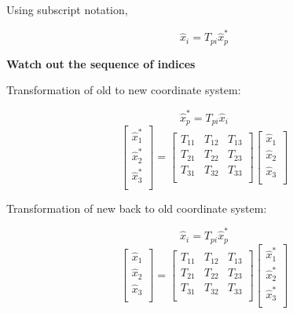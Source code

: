 Using subscript notation,

$$ \hat{x}_i = T_{pi} \hat{x}^*_p $$


{\bf Watch out the sequence of indices}

Transformation of old to new coordinate system:

$$ \hat{x}^*_p = T_{pi} \hat{x}_i $$
\begin{equation*}
\left[ 
\begin{array}{l}
\hat{x}_1^*  \\
\hat{x}_2^* \\
\hat{x}_3^*  \\
\end{array}
\right] 
= \left[ 
\begin{array}{lll}
T_{11} & T_{12} & T_{13} \\
T_{21} & T_{22} & T_{23} \\
T_{31} & T_{32} & T_{33} \\
\end{array}
\right] 
\left[ 
\begin{array}{l}
\hat{x}_1 \\
\hat{x}_2 \\
\hat{x}_3 \\
\end{array}
\right]
\end{equation*}

Transformation of new back to old coordinate system:

$$ \hat{x}_i = T_{pi} \hat{x}^*_p $$
\begin{equation*}
\left[ 
\begin{array}{l}
\hat{x}_1  \\
\hat{x}_2 \\
\hat{x}_3  \\
\end{array}
\right] 
= \left[ 
\begin{array}{lll}
T_{11} & T_{12} & T_{13} \\
T_{21} & T_{22} & T_{23} \\
T_{31} & T_{32} & T_{33} \\
\end{array}
\right] 
\left[ 
\begin{array}{l}
\hat{x}^*_1 \\
\hat{x}^*_2 \\
\hat{x}^*_3 \\
\end{array}
\right]
\end{equation*}


